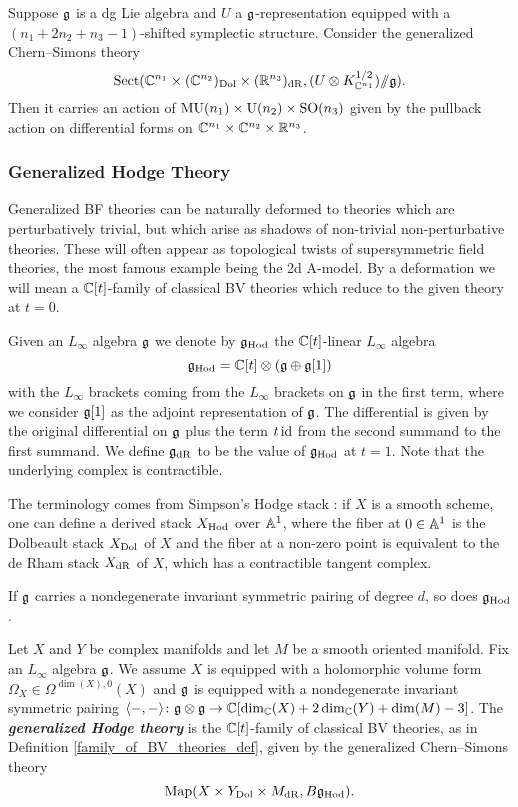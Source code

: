 \documentclass[10pt, oneside]{article}
\newcommand{\Hod}{\mathrm{Hod}}
\newcommand{\MU}{\mathrm{MU}}
\newcommand{\Sect}{\mathrm{Sect}}
\renewcommand{\U}{\mathrm{U}}
\newcommand{\ham}{/\!\!/}
\newcommand{\defterm}[1]{\textbf{\emph{#1}}}
\begin{document}
\begin{prop}
Suppose $\mathfrak g$ is a dg Lie algebra and $U$ a $\mathfrak g$-representation equipped with a $(n_1+2n_2+n_3-1)$-shifted symplectic structure. Consider the generalized Chern--Simons theory
\[\Sect(\CC^{n_1}\times (\CC^{n_2})_{\mr{Dol}}\times (\RR^{n_3})_{\mr{dR}}, (U\otimes K_{\CC^{n_1}}^{1/2})\ham\fg).\]
Then it carries an action of $\MU(n_1)\times \U(n_2)\times \SO(n_3)$ given by the pullback action on differential forms on $\mathbb C^{n_1}\times \mathbb C^{n_2}\times \mathbb R^{n_3}$.
\end{prop}

\subsubsection{Generalized Hodge Theory}
Generalized BF theories can be naturally deformed to theories which are perturbatively trivial, but which arise as shadows of non-trivial non-perturbative theories.  These will often appear as topological twists of supersymmetric field theories, the most famous example being the 2d A-model. By a deformation we will mean a $\mathbb C[t]$-family of classical BV theories which reduce to the given theory at $t=0$.

Given an $L_\infty$ algebra $\mathfrak g$ we denote by $\fg_{\Hod}$ the $\mathbb C[t]$-linear $L_\infty$ algebra
\[\fg_{\Hod} = \CC[t]\otimes (\fg\oplus \fg[1])\]
with the $L_\infty$ brackets coming from the $L_\infty$ brackets on $\mathfrak g$ in the first term, where we consider $\mathfrak g[1]$ as the adjoint representation of $\mathfrak g$. The differential is given by the original differential on $\mathfrak g$ plus the term $t\operatorname{id}$ from the second summand to the first summand. We define $\mathfrak g_{\mathrm{dR}}$ to be the value of $\fg_{\Hod}$ at $t=1$. Note that the underlying complex is contractible.

\begin{remark}
The terminology comes from Simpson's Hodge stack \cite{Simpson}: if $X$ is a smooth scheme, one can define a derived stack $X_{\mathrm{Hod}}$ over $\mathbb{A}^1$, where the fiber at $0 \in \mathbb{A}^1$ is the Dolbeault stack $X_{\mathrm{Dol}}$ of $X$ and the fiber at a non-zero point is equivalent to the de Rham stack $X_{\mathrm{dR}}$ of $X$, which has a contractible tangent complex.
\end{remark}

If $\mathfrak g$ carries a nondegenerate invariant symmetric pairing of degree $d$, so does $\fg_{\Hod}$.

\begin{definition} \label{Hodge_family_def}
Let $X$ and $Y$ be complex manifolds and let $M$ be a smooth oriented manifold. Fix an $L_\infty$ algebra $\mathfrak g$. We assume $X$ is equipped with a holomorphic volume form $\Omega_X \in\Omega^{\dim(X), 0}(X)$ and $\mathfrak g$ is equipped with a nondegenerate invariant symmetric pairing $\langle-, -\rangle\colon \mathfrak g\otimes\mathfrak g\rightarrow \mathbb C[\dim_\mathbb C(X) + 2\dim_\mathbb C(Y) + \dim(M) - 3]$. The \defterm{generalized Hodge theory} is the $\mathbb C[t]$-family of classical BV theories, as in Definition \ref{family_of_BV_theories_def}, given by the generalized Chern--Simons theory
\[\map(X\times Y_{\mr{Dol}}\times M_{\mr{dR}}, B \fg_\Hod).\]
\end{definition}
\end{document}
